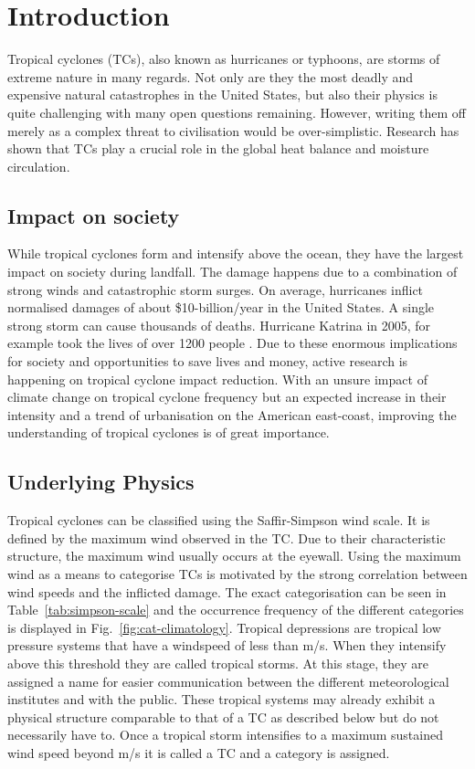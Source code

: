 \chapter{Introduction}\label{sec:introduction}
Tropical cyclones (TCs), also known as hurricanes or typhoons, are storms of extreme nature in many regards. Not only are they the most deadly and expensive natural catastrophes in the United States, but also their physics is quite challenging with many open questions remaining\cite{emanuel-summ}.
However, writing them off merely as a complex threat to civilisation would be over-simplistic. Research has shown that TCs play a crucial role in the global heat balance and moisture circulation\cite{moisture-transport}\cite{global-heat}.

\section{Impact on society}\label{sec:society}
While tropical cyclones form and intensify above the ocean, they have the largest impact on society during landfall. The damage happens due to a combination of strong winds and catastrophic storm surges. On average, hurricanes inflict normalised damages of about \$10-billion/year in the United States\cite{damage-norm}. A single strong storm can cause thousands of deaths. Hurricane Katrina in 2005, for example took the lives of over 1200 people \cite{hurr-2005}.
Due to these enormous implications for society and opportunities to save lives and money, active research is happening on tropical cyclone impact reduction. With an unsure impact of climate change on tropical cyclone frequency but an expected increase in their intensity and a trend of urbanisation on the American east-coast, improving the understanding of tropical cyclones is of great importance.

\section{Underlying Physics}\label{sec:physics}
Tropical cyclones can be classified using the Saffir-Simpson wind scale. It is defined by the maximum wind observed in the TC. Due to their characteristic structure, the maximum wind usually occurs at the eyewall. Using the maximum wind as a means to categorise TCs is motivated by the strong correlation between wind speeds and the inflicted damage\cite{simpson}. The exact categorisation can be seen in Table~\ref{tab:simpson-scale} and the occurrence frequency of the different categories is displayed in Fig.~\ref{fig:cat-climatology}. Tropical depressions are tropical low pressure systems that have a windspeed of less than \unit[17]{m/s}. When they intensify above this threshold they are called tropical storms. At this stage, they are assigned a name for easier communication between the different meteorological institutes and with the public. These tropical systems may already exhibit a physical structure comparable to that of a TC as described below but do not necessarily have to. Once a tropical storm intensifies to a maximum sustained wind speed beyond \unit[33]{m/s} it is called a TC and a category is assigned.

